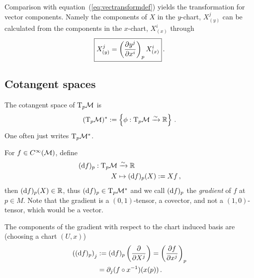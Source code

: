 \documentclass[11pt, a4paper, twocolumn]{article} %
\begin{document}
Comparison with equation~(\ref{eq:vectransformdef}) yields the transformation for vector components.
Namely the components of $X$ in the $y$-chart, $X^{j}_{(y)}$ can be calculated from the components
in the $x$-chart, $X^i_{(x)}$ through
\begin{equation}
    \boxed{%
    X^j_{(y)} = \left( \frac{\partial y^j}{\partial x^i} \right)_p X^{i}_{(x)}
}\,.
\end{equation}

\subsection{Cotangent spaces}
The cotangent space of $\T_p\M$ is
\begin{equation}
    (\T_p\M)^* := \left\{ \phi: \T_p\M \linearto \mathbb{R} \right\}\,.
\end{equation}
One often just writes $\T_p\M^*$.
\begin{exmp}[Gradient]
    For $f\in C^\infty(\mathcal{M})$, define 
    \begin{align}
        (\diff f)_p: \T_p\M &\linearto \mathbb{R}\nonumber\\
        X &\mapsto (\diff f)_p(X) := Xf\,,
    \end{align}
    then $(\operatorname{d\!} f)_p(X) \in \mathbb{R}$, thus
    $(\diff f)_p \in \T_p\M^*$ and we call $(\operatorname{d\!} f)_p$ the \textit{gradient} of $f$ at $p\in M$. 
    Note that the gradient is a $(0,1)$-tensor, a covector, and not a $(1,0)$-tensor,
    which would be a vector.

    The components of the gradient with respect to the chart induced basis are
    (choosing a chart $(U, x)$)
    \begin{align}
        \nonumber \left( (\operatorname{d\!} f)_p \right)_j &:= (\operatorname{d\!} f)_p\left( \frac{\partial}{\partial X^j} \right)
        = \left( \frac{\partial f}{\partial x^j} \right)_p\\
        &= \partial_j (f\circ x^{-1})(x(p))\,.
    \end{align}
\end{exmp}
\end{document}

